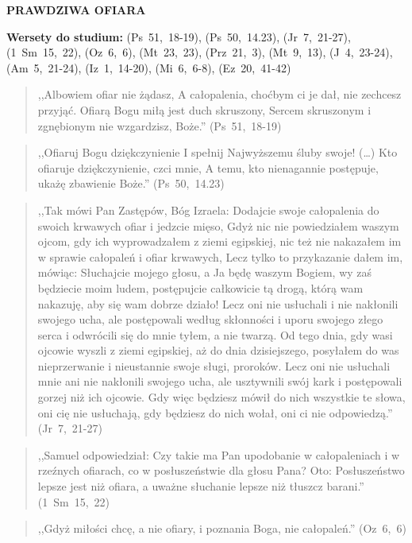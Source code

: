 \documentclass[10pt,a4paper,oneside]{article}
\begin{document}
\centerline{\textbf{\MakeUppercase{Prawdziwa ofiara}}}
\begin{center}
\textbf{Wersety do studium:} \mbox{(Ps 51, 18-19)}, \mbox{(Ps 50, 14.23)}, \mbox{(Jr 7, 21-27)}, \mbox{(1 Sm 15, 22)}, \mbox{(Oz 6, 6)}, \mbox{(Mt 23, 23)}, \mbox{(Prz 21, 3)}, \mbox{(Mt 9, 13)}, \mbox{(J 4, 23-24)}, \mbox{(Am 5, 21-24)}, \mbox{(Iz 1, 14-20)}, \mbox{(Mi 6, 6-8)}, \mbox{(Ez 20, 41-42)}
\end{center}
\begin{quote}
,,Albowiem ofiar nie żądasz, A całopalenia, choćbym ci je dał, nie zechcesz przyjąć. Ofiarą Bogu miłą jest duch skruszony, Sercem skruszonym i zgnębionym nie wzgardzisz, Boże.'' \mbox{(Ps 51, 18-19)}
\end{quote}
\begin{quote}
,,Ofiaruj Bogu dziękczynienie I spełnij Najwyższemu śluby swoje! (\ldots) Kto ofiaruje dziękczynienie, czci mnie, A temu, kto nienagannie postępuje, ukażę zbawienie Boże.'' \mbox{(Ps 50, 14.23)}
\end{quote}
\begin{quote}
,,Tak mówi Pan Zastępów, Bóg Izraela: Dodajcie swoje całopalenia do swoich krwawych ofiar i jedzcie mięso, Gdyż nic nie powiedziałem waszym ojcom, gdy ich wyprowadzałem z ziemi egipskiej, nic też nie nakazałem im w sprawie całopaleń i ofiar krwawych, Lecz tylko to przykazanie dałem im, mówiąc: Słuchajcie mojego głosu, a Ja będę waszym Bogiem, wy zaś będziecie moim ludem, postępujcie całkowicie tą drogą, którą wam nakazuję, aby się wam dobrze działo! Lecz oni nie usłuchali i nie nakłonili swojego ucha, ale postępowali według skłonności i uporu swojego złego serca i odwrócili się do mnie tyłem, a nie twarzą. Od tego dnia, gdy wasi ojcowie wyszli z ziemi egipskiej, aż do dnia dzisiejszego, posyłałem do was nieprzerwanie i nieustannie swoje sługi, proroków. Lecz oni nie usłuchali mnie ani nie nakłonili swojego ucha, ale usztywnili swój kark i postępowali gorzej niż ich ojcowie. Gdy więc będziesz mówił do nich wszystkie te słowa, oni cię nie usłuchają, gdy będziesz do nich wołał, oni ci nie odpowiedzą.'' \mbox{(Jr 7, 21-27)}
\end{quote}
\begin{quote}
,,Samuel odpowiedział: Czy takie ma Pan upodobanie w całopaleniach i w rzeźnych ofiarach, co w posłuszeństwie dla głosu Pana? Oto: Posłuszeństwo lepsze jest niż ofiara, a uważne słuchanie lepsze niż tłuszcz barani.'' \mbox{(1 Sm 15, 22)}
\end{quote}
\begin{quote}
,,Gdyż miłości chcę, a nie ofiary, i poznania Boga, nie całopaleń.'' \mbox{(Oz 6, 6)}
\end{quote}
\end{document}
